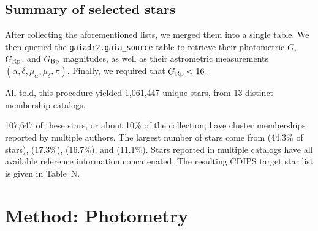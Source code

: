 \documentclass[12pt,twocolumn,tighten]{aastex62}
\begin{document}
\subsection{Summary of selected stars}

After collecting the aforementioned lists, we
merged them into a single table. We then queried the
\texttt{gaiadr2.gaia\_source} table to retrieve their photometric $G$,
$G_{\rm Rp}$, and $G_{\rm Bp}$ magnitudes, as well as their
astrometric measurements $(\alpha, \delta, \mu_\alpha, \mu_\delta,
\pi)$.  Finally, we required that $G_{\rm Rp} < 16$.  

All told, this procedure yielded 1{,}061{,}447 unique stars, from 13 distinct
membership catalogs.

107{,}647 of these stars, or about
10\% of the collection, have cluster memberships reported by
multiple authors.  The largest number of stars come from
\citealt{dias_proper_2014} (44.3\% of stars), \citealt{Kharchenko_et_al_2013}
(17.3\%), \citealt{cantat-gaudin_gaia_2018} (16.7\%), and \citealt{zari_3d_2018}
(11.1\%).
Stars reported in multiple catalogs have all available reference information
concatenated.  
The resulting CDIPS target star list is given in Table~N.




\section{Method: Photometry}
\label{sec:method}
\end{document}
